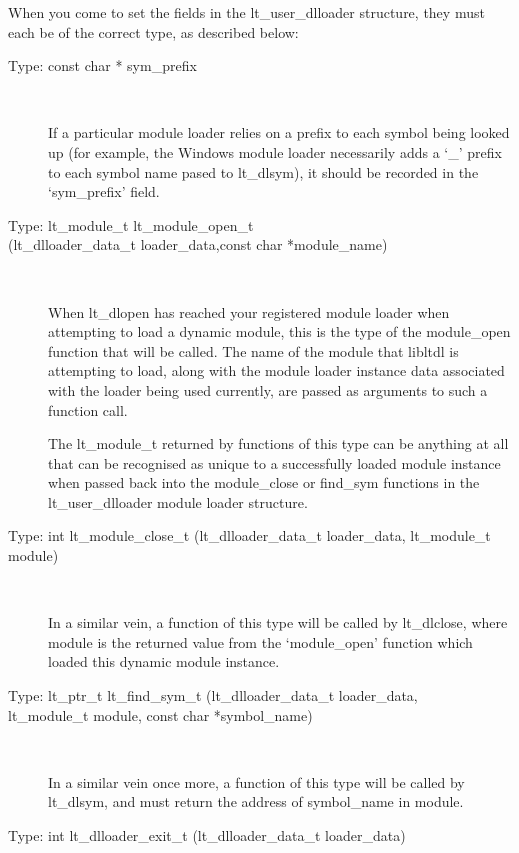 When you come to set the fields in the lt\_{}user\_{}dlloader structure, they must each be of the correct type, as described below:

\begin{description}
\item[Type: const char * sym\_{}prefix]
\

If a particular module loader relies on a prefix to each symbol being looked 
up (for example, the Windows module loader necessarily adds a `\_{}' prefix 
to each symbol name pased to lt\_{}dlsym), it should be recorded in 
the `sym\_{}prefix' field. 

\item[Type: lt\_{}module\_{}t lt\_{}module\_{}open\_{}t]
\item[(lt\_{}dlloader\_{}data\_{}t loader\_{}data,const char *module\_{}name)]
\

    When lt\_{}dlopen has reached your registered module loader when attempting to load a dynamic module, this is the type of the module\_{}open function that will be called. The name of the module that libltdl is attempting to load, along with the module loader instance data associated with the loader being used currently, are passed as arguments to such a function call.

    The lt\_{}module\_{}t returned by functions of this type can be anything at all that can be recognised as unique to a successfully loaded module instance when passed back into the module\_{}close or find\_{}sym functions in the lt\_{}user\_{}dlloader module loader structure. 

\item[Type: int lt\_{}module\_{}close\_{}t (lt\_{}dlloader\_{}data\_{}t loader\_{}data, lt\_{}module\_{}t module)]
\

    In a similar vein, a function of this type will be called by lt\_{}dlclose, where module is the returned value from the `module\_{}open' function which loaded this dynamic module instance. 

\item[Type: lt\_{}ptr\_{}t lt\_{}find\_{}sym\_{}t (lt\_{}dlloader\_{}data\_{}t loader\_{}data,]
\item[lt\_{}module\_{}t module, const char *symbol\_{}name)]
\

    In a similar vein once more, a function of this type will be called by lt\_{}dlsym, and must return the address of symbol\_{}name in module. 

\item[Type: int lt\_{}dlloader\_{}exit\_{}t (lt\_{}dlloader\_{}data\_{}t loader\_{}data)]
\


\end{description}
